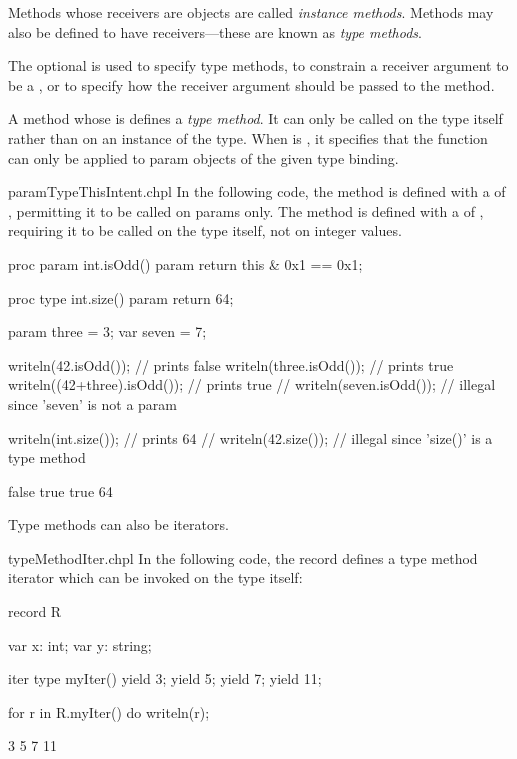 Methods whose receivers are objects are called \emph{instance
methods}.  Methods may also be defined to have 
receivers---these are known as \emph{type methods}.

The optional  is used to specify type methods, to
constrain a receiver argument to be a , or to specify how
the receiver argument should be passed to the method.

A method whose  is  defines a \emph{type
method}.  It can only be called on the type itself rather than on an
instance of the type.  When  is , it
specifies that the function can only be applied to param objects of
the given type binding.

\begin{chapelexample}{paramTypeThisIntent.chpl}
In the following code, the  method is defined with
a  of , permitting it to be called on
params only.  The  method is defined with
a  of , requiring it to be called on
the  type itself, not on integer values.
\begin{chapel}
proc param int.isOdd() param {
  return this & 0x1 == 0x1;
}

proc type int.size() param {
  return 64;
}

param three = 3;
var seven = 7;

writeln(42.isOdd());          // prints false
writeln(three.isOdd());       // prints true
writeln((42+three).isOdd());  // prints true
// writeln(seven.isOdd());    // illegal since 'seven' is not a param

writeln(int.size());          // prints 64
// writeln(42.size());        // illegal since 'size()' is a type method
\end{chapel}
\begin{chapeloutput}
false
true
true
64
\end{chapeloutput}
\end{chapelexample}

Type methods can also be iterators.

\begin{chapelexample}{typeMethodIter.chpl}
In the following code, the record  defines a type method
iterator which can be invoked on the type itself:
\begin{chapel}
record R {
  var x: int;
  var y: string;

  iter type myIter() {
    yield 3;
    yield 5;
    yield 7;
    yield 11;
  }
}

for r in R.myIter() do
  writeln(r);
\end{chapel}
\begin{chapeloutput}
3
5
7
11
\end{chapeloutput}
\end{chapelexample}

